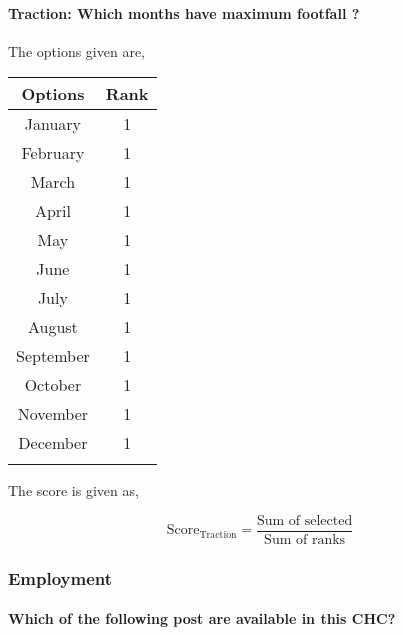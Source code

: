 \documentclass[oneside]{article}
\newcommand{\tsub}[2]{\text{#1}_{\text{#2}}}
\newcommand{\dsub}[2]{\dfrac{\text{#1}}{\text{#2}}}
\newcommand{\multsel}[1]
{
	\[
		\tsub{Score}{#1} = \dsub{Sum of selected}{Sum of ranks}
	\]
}
\newenvironment{ttable}
{
\begin{center}
\begin{tabular}{c|c}
\hline
}
{
\\ \hline
\end{tabular}
\end{center}
}
\begin{document}
\paragraph{Traction: Which months have maximum footfall ?}

The options given are,
\begin{ttable}
Options & Rank \\ \hline
January & 1 \\
 February & 1 \\
March & 1 \\
April & 1 \\
May & 1 \\
June & 1 \\
July & 1 \\
August & 1 \\
September & 1 \\
October & 1 \\
November & 1 \\
December & 1 \\
\hline
\end{ttable}
The score is given as,
\multsel{Traction}

\subsubsection{Employment}

\paragraph{ Which of the following post are available in this CHC?}
\end{document}
